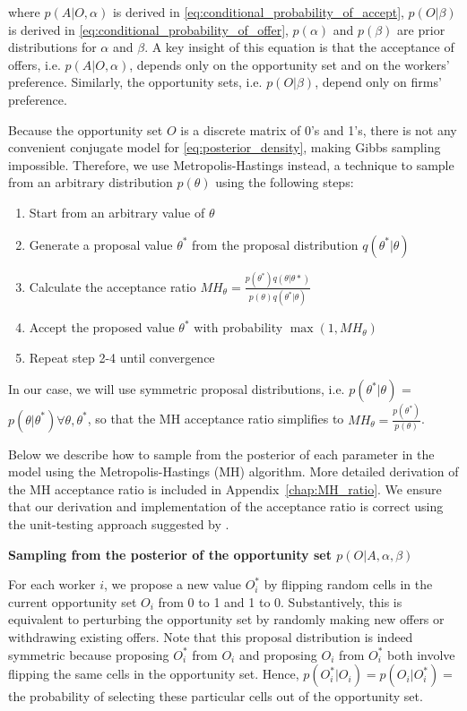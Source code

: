 where $p(A|O, \alpha)$ is derived in
\eqref{eq:conditional_probability_of_accept}, $p(O|\beta)$ is derived in
\eqref{eq:conditional_probability_of_offer}, $p(\alpha)$ and $p(\beta)$ are
prior distributions for $\alpha$ and $\beta$. A key insight of this equation is
that the acceptance of offers, i.e. $p(A|O, \alpha)$, depends only on the
opportunity set and on the workers' preference. Similarly, the opportunity sets,
i.e. $p(O|\beta)$, depend only on firms' preference.

Because the opportunity set $O$ is a discrete matrix of 0's and 1's, there is
not any convenient conjugate model for \eqref{eq:posterior_density}, making
Gibbs sampling impossible. Therefore, we use Metropolis-Hastings instead, a
technique to sample from an arbitrary distribution $p(\theta)$ using the
following steps:

\begin{enumerate}
\item Start from an arbitrary value of $\theta$
\item Generate a proposal value $\theta^*$ from the proposal distribution
  $q(\theta^*|\theta)$
\item Calculate the acceptance ratio $MH_{\theta} =
  \frac{p(\theta^*)q(\theta|\theta*)}{p(\theta)q(\theta^*|\theta)}$
\item Accept the proposed value $\theta^*$ with probability $\max(1,
  MH_{\theta})$
\item Repeat step 2-4 until convergence
\end{enumerate}

In our case, we will use symmetric proposal distributions, i.e.
$p(\theta^*|\theta)$ = $p(\theta | \theta^*) \forall \theta, \theta^*$, so that
the MH acceptance ratio simplifies to $MH_{\theta} =
\frac{p(\theta^*)}{p(\theta)}$.

Below we describe how to sample from the posterior of each parameter in the
model using the Metropolis-Hastings (MH) algorithm. More detailed derivation of
the MH acceptance ratio is included in Appendix~\ref{chap:MH_ratio}. We ensure
that our derivation and implementation of the acceptance ratio is correct using
the unit-testing approach suggested by \citet{Grosse2014}.

\textbf{Sampling from the posterior of the opportunity set $p(O|A, \alpha,
  \beta)$}

For each worker $i$, we propose a new value $O_i^*$ by flipping random cells in
the current opportunity set $O_i$ from 0 to 1 and 1 to 0. Substantively, this is
equivalent to perturbing the opportunity set by randomly making new offers or
withdrawing existing offers. Note that this proposal distribution is indeed
symmetric because proposing $O_i^*$ from $O_i$ and proposing $O_i$ from $O_i^*$
both involve flipping the same cells in the opportunity set. Hence,
$p(O_i^*|O_i) = p(O_i|O_i^*) =$ the probability of selecting these particular
cells out of the opportunity set.

